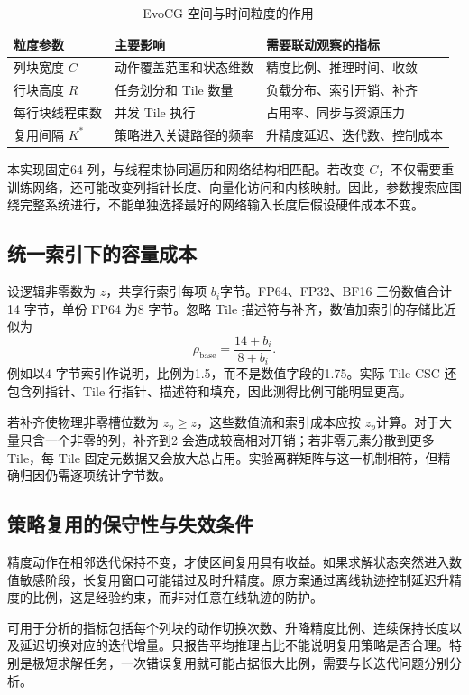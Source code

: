 \begin{table}[htbp]\centering\caption{EvoCG 空间与时间粒度的作用}
\begin{tabularx}{\textwidth}{p{2.5cm}XX}\toprule
粒度参数&主要影响&需要联动观察的指标\\\midrule
列块宽度 $C$&动作覆盖范围和状态维数&精度比例、推理时间、收敛\\
行块高度 $R$&任务划分和 Tile 数量&负载分布、索引开销、补齐\\
每行块线程束数&并发 Tile 执行&占用率、同步与资源压力\\
复用间隔 $K^*$&策略进入关键路径的频率&升精度延迟、迭代数、控制成本\\\bottomrule
\end{tabularx}\end{table}

本实现固定64 列，与线程束协同遍历和网络结构相匹配。若改变 $C$，不仅需要重训练网络，还可能改变列指针长度、向量化访问和内核映射。因此，参数搜索应围绕完整系统进行，不能单独选择最好的网络输入长度后假设硬件成本不变。

\subsection{统一索引下的容量成本}
设逻辑非零数为 $z$，共享行索引每项 $b_i$字节。FP64、FP32、BF16 三份数值合计14 字节，单份 FP64 为8 字节。忽略 Tile 描述符与补齐，数值加索引的存储比近似为
\begin{equation}
 \rho_{\mathrm{base}}=\frac{14+b_i}{8+b_i}.
\end{equation}
例如以4 字节索引作说明，比例为1.5，而不是数值字段的1.75。实际 Tile-CSC 还包含列指针、Tile 行指针、描述符和填充，因此测得比例可能明显更高。

若补齐使物理非零槽位数为 $z_p\geq z$，这些数值流和索引成本应按 $z_p$计算。对于大量只含一个非零的列，补齐到2 会造成较高相对开销；若非零元素分散到更多 Tile，每 Tile 固定元数据又会放大总占用。实验离群矩阵与这一机制相符，但精确归因仍需逐项统计字节数。

\subsection{策略复用的保守性与失效条件}
精度动作在相邻迭代保持不变，才使区间复用具有收益。如果求解状态突然进入数值敏感阶段，长复用窗口可能错过及时升精度。原方案通过离线轨迹控制延迟升精度的比例，这是经验约束，而非对任意在线轨迹的防护。

可用于分析的指标包括每个列块的动作切换次数、升降精度比例、连续保持长度以及延迟切换对应的迭代增量。只报告平均推理占比不能说明复用策略是否合理。特别是极短求解任务，一次错误复用就可能占据很大比例，需要与长迭代问题分别分析。

